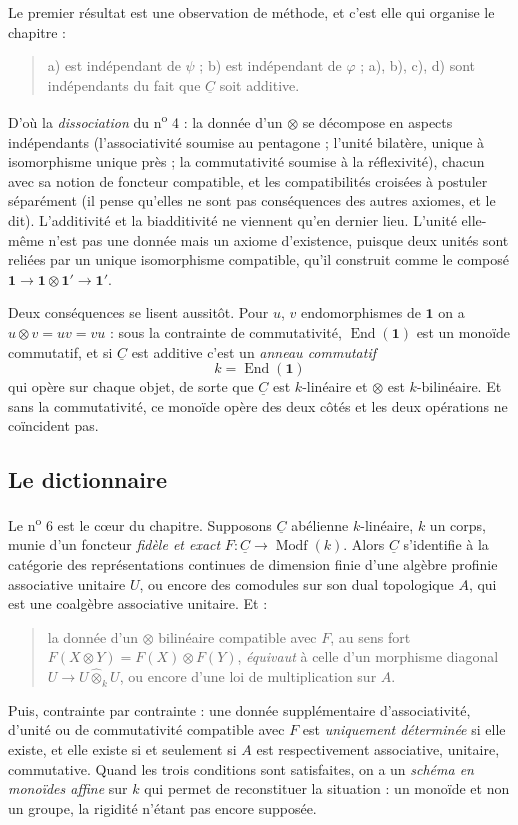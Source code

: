 \documentclass[11pt,a4paper]{article}
\begin{document}
Le premier résultat est une observation de méthode, et c'est elle qui organise
le chapitre :
\begin{quote}
a) est indépendant de $\psi$ ; b) est indépendant de $\varphi$ ; a), b), c),
d) sont indépendants du fait que $\underline{C}$ soit additive.
\end{quote}
D'où la \emph{dissociation} du n\textsuperscript{o} 4 : la donnée d'un
$\otimes$ se décompose en aspects indépendants (l'associativité soumise au
pentagone ; l'unité bilatère, unique à isomorphisme unique près ; la
commutativité soumise à la réflexivité), chacun avec sa notion de foncteur
compatible, et les compatibilités croisées à postuler séparément (il pense
qu'elles ne sont pas conséquences des autres axiomes, et le dit).
L'additivité et la biadditivité ne viennent qu'en dernier lieu. L'unité elle-même
n'est pas une donnée mais un axiome d'existence, puisque deux unités sont
reliées par un unique isomorphisme compatible, qu'il construit comme le composé
$\mathbf{1} \to \mathbf{1} \otimes \mathbf{1}' \to \mathbf{1}'$.

Deux conséquences se lisent aussitôt. Pour $u$, $v$ endomorphismes de
$\mathbf{1}$ on a $u \otimes v = uv = vu$ : sous la contrainte de
commutativité, $\operatorname{End}(\mathbf{1})$ est un monoïde commutatif, et
si $\underline{C}$ est additive c'est un \emph{anneau commutatif}
\[
k = \operatorname{End}(\mathbf{1})
\]
qui opère sur chaque objet, de sorte que $\underline{C}$ est
$k$-linéaire et $\otimes$ est $k$-bilinéaire. Et sans la commutativité, ce
monoïde opère des deux côtés et les deux opérations ne coïncident pas.

\subsection*{Le dictionnaire}

Le n\textsuperscript{o} 6 est le cœur du chapitre. Supposons
$\underline{C}$ abélienne $k$-linéaire, $k$ un corps, munie d'un foncteur
\emph{fidèle et exact} $F \colon \underline{C} \to \operatorname{Modf}(k)$.
Alors $\underline{C}$ s'identifie à la catégorie des représentations continues
de dimension finie d'une algèbre profinie associative unitaire $U$, ou encore
des comodules sur son dual topologique $A$, qui est une coalgèbre associative
unitaire. Et :

\begin{quote}
la donnée d'un $\otimes$ bilinéaire compatible avec $F$, au sens fort
$F(X \otimes Y) = F(X) \otimes F(Y)$, \emph{équivaut} à celle d'un morphisme
diagonal $U \to U \mathbin{\widehat{\otimes}_{k}} U$, ou encore d'une loi de
multiplication sur $A$.
\end{quote}
Puis, contrainte par contrainte : une donnée supplémentaire d'associativité,
d'unité ou de commutativité compatible avec $F$ est \emph{uniquement
déterminée} si elle existe, et elle existe si et seulement si $A$ est
respectivement associative, unitaire, commutative. Quand les trois conditions
sont satisfaites, on a un \emph{schéma en monoïdes affine} sur $k$ qui permet
de reconstituer la situation : un monoïde et non un groupe, la rigidité
n'étant pas encore supposée.
\end{document}

